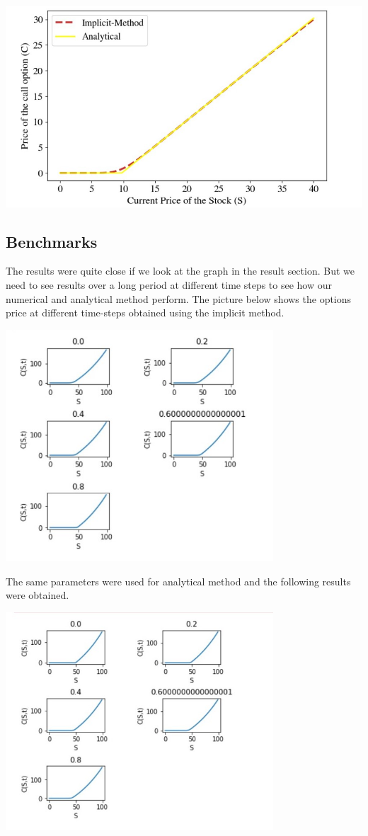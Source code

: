 \documentclass[12pt]{article}
\begin{document}
 
 \includegraphics[width=14cm]{P1}
 \subsection{Benchmarks}
 
 The results were quite close if we look at the graph in the result section. But we need to see results over a long period at different time steps to see how our numerical and analytical method perform. 
 The picture below shows the options price at different time-steps obtained using the implicit method.
 
  \includegraphics[width=10cm]{p3}
  
The same parameters were used for analytical method and the following results were obtained. 

\includegraphics[width=10cm]{p4}
\end{document}
